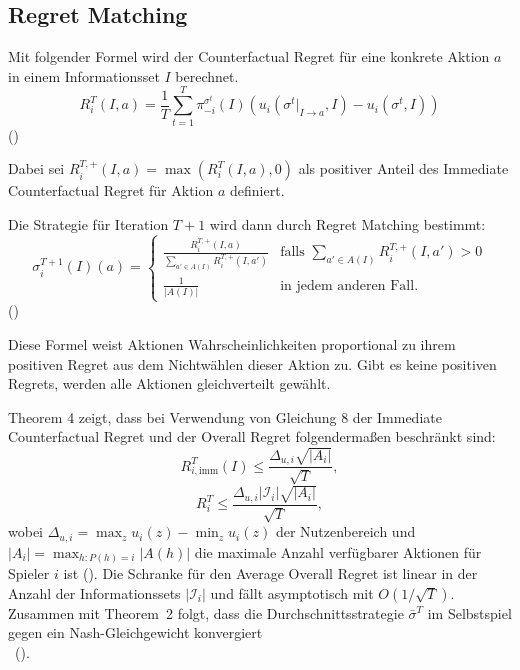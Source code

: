 \subsection{Regret Matching}

Mit folgender Formel wird der Counterfactual Regret für eine konkrete Aktion $a$ in einem Informationsset $I$ berechnet.
\begin{equation}
    R_i^{T}(I, a) = \frac{1}{T} \sum_{t=1}^{T} \pi_{-i}^{\sigma^{t}}(I)
    \left( u_i(\sigma^{t}|_{I \to a}, I) - u_i(\sigma^{t}, I) \right)
\end{equation}
(\cite[Eq.~7]{zinkevich2007regret})

Dabei sei $R_i^{T,+}(I, a) = \max(R_i^{T}(I, a), 0)$ als positiver Anteil des Immediate Counterfactual Regret für Aktion $a$ definiert.

Die Strategie für Iteration $T+1$ wird dann durch Regret Matching bestimmt:
\begin{equation}
\sigma_i^{T+1}(I)(a) = \begin{cases}
\frac{R_i^{T,+}(I, a)}{\sum_{a' \in A(I)} R_i^{T,+}(I, a')} & \text{falls } \sum_{a' \in A(I)} R_i^{T,+}(I, a') > 0 \\
\frac{1}{|A(I)|} & \text{in jedem anderen Fall.}
\end{cases}
\end{equation}
(\cite[Eq.~8]{zinkevich2007regret})

Diese Formel weist Aktionen Wahrscheinlichkeiten proportional zu ihrem positiven Regret aus dem Nichtwählen dieser Aktion zu.
Gibt es keine positiven Regrets, werden alle Aktionen gleichverteilt gewählt.

Theorem 4 zeigt, dass bei Verwendung von Gleichung 8 der Immediate Counterfactual Regret und der Overall Regret folgendermaßen beschränkt sind:
\begin{equation}
R_{i,\mathrm{imm}}^{T}(I) \le \frac{\Delta_{u,i}\sqrt{|A_i|}}{\sqrt{T}},
\end{equation}
\begin{equation}
R_i^T \le \frac{\Delta_{u,i}|\mathcal{I}_i|\sqrt{|A_i|}}{\sqrt{T}},
\end{equation}
wobei $\Delta_{u,i} = \max_z u_i(z) - \min_z u_i(z)$ der Nutzenbereich und $|A_i| = \max_{h:P(h)=i} |A(h)|$ die maximale Anzahl verfügbarer Aktionen für Spieler $i$ ist (\cite[Thm.~4]{zinkevich2007regret}).
Die Schranke für den Average Overall Regret ist linear in der Anzahl der Informationssets $|\mathcal{I}_i|$ und fällt asymptotisch mit $O(1/\sqrt{T})$.
Zusammen mit Theorem~2 folgt, dass die Durchschnittsstrategie $\bar\sigma^T$ im Selbstspiel gegen ein Nash-Gleichgewicht konvergiert\\~(\cite[Thm.~2]{zinkevich2007regret}).
